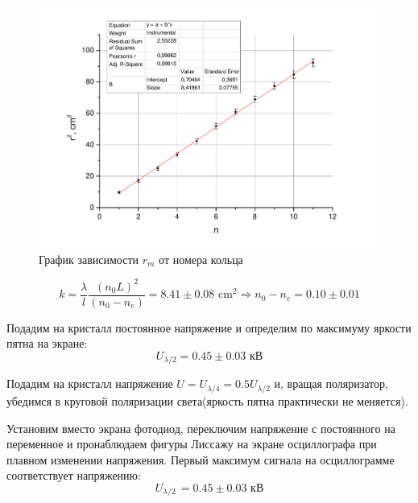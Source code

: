 \documentclass[a4paper,12pt]{article}
\begin{document}
		\begin{figure}[h!]\label{fig:radius}
			\begin{center}
				\includegraphics[scale=0.5]{graph}
				\caption{График зависимости $r_m$ от номера кольца}
			\end{center}
		\end{figure}
		
		$$ k = \frac{\lambda}{l}\frac{(n_0L)^2}{(n_0 - n_e)} = 8.41\pm0.08\text{ cm}^2 \Rightarrow n_0 - n_e = 0.10\pm0.01 $$
		
		Подадим на кристалл постоянное напряжение и определим по максимуму яркости пятна на экране:$$ U_{\lambda/2} = 0.45\pm0.03 \text{ кВ}$$
		
		Подадим на кристалл напряжение $U = U_{\lambda/4} = 0.5U_{\lambda/2}$ и, вращая поляризатор, убедимся в круговой поляризации света(яркость пятна практически не меняется).
		
		
		Установим вместо экрана фотодиод, переключим напряжение с постоянного на переменное и пронаблюдаем фигуры Лиссажу на экране осциллографа при плавном изменении напряжения. Первый максимум сигнала на осциллограмме соответствует напряжению:$$ U_{\lambda/2~} = 0.45\pm0.03\text{ кВ}$$
		
\end{document}

